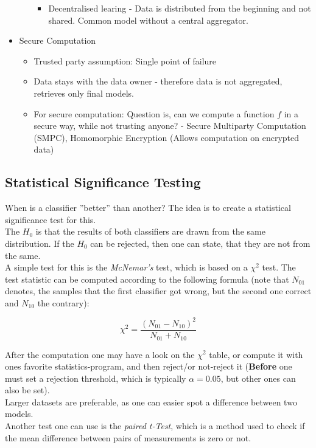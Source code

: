 \documentclass[12pt,a4paper]{article}
\begin{document}
\begin{itemize}
\begin{itemize}
\begin{itemize}
                    \item Decentralised learing - Data is distributed from the beginning and not shared. Common model without a central aggregator.
                \end{itemize}
        \end{itemize}
    \item Secure Computation
        \begin{itemize}
            \item Trusted party assumption: Single point of failure
            \item Data stays with the data owner - therefore data is not aggregated, retrieves only final models.
            \item For secure computation: Question is, can we compute a function \(f\) in a secure way, while not trusting anyone? - Secure Multiparty Computation (SMPC), Homomorphic Encryption (Allows computation on encrypted data)
        \end{itemize}
\end{itemize}

\subsection{Statistical Significance Testing}

\noindent When is a classifier ''better'' than another? The idea is to create a statistical significance test for this.\\
The \(H_0\) is that the results of both classifiers are drawn from the same distribution. If the \(H_0\) can be rejected, then one can state, that they are not from the same.\\
A simple test for this is the \textit{McNemar's} test, which is based on a \(\chi^2\) test. The test statistic can be computed according to the following formula (note that \(N_{01}\) denotes, the samples that the first classifier got wrong, but the second one correct and \(N_{10}\) the contrary):

\[\chi^2 = \frac{(N_{01} - N_{10})^2}{N_{01} + N_{10}}\]

\noindent After the computation one may have a look on the \(\chi^2\) table, or compute it with ones favorite statistics-program, and then reject/or not-reject it (\textbf{Before} one must set a rejection threshold, which is typically \(\alpha = 0.05\), but other ones can also be set).\\
Larger datasets are preferable, as one can easier spot a difference between two models.\\[1em]
Another test one can use is the \textit{paired t-Test}, which is a method used to check if the mean difference between pairs of measurements is zero or not.\\



\newpage
\printbibliography
\end{document}
